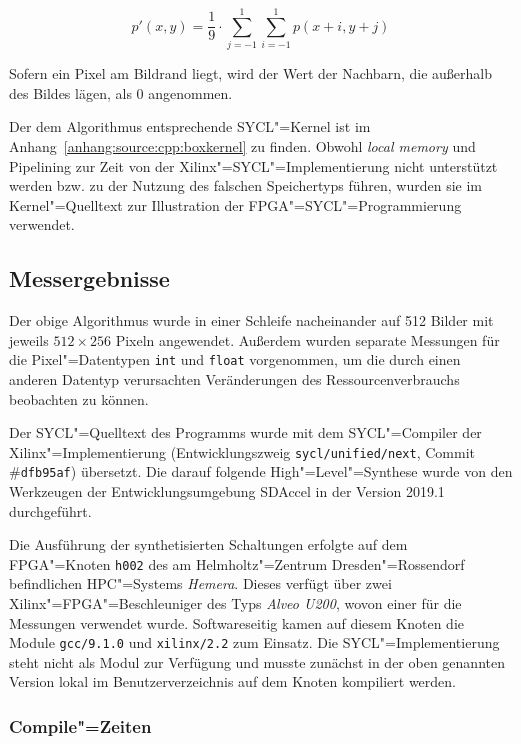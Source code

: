\begin{equation}
    p'(x, y) = \frac{1}{9} \cdot \sum_{j = {-1}}^{1} \sum_{i = {-1}}^{1} p(x + i, y + j)
\end{equation}

Sofern ein Pixel am Bildrand liegt, wird der Wert der Nachbarn, die außerhalb
des Bildes lägen, als $0$ angenommen.

Der dem Algorithmus entsprechende SYCL"=Kernel ist im
Anhang~\ref{anhang:source:cpp:boxkernel} zu finden. Obwohl \textit{local memory}
und Pipelining zur Zeit von der Xilinx"=SYCL"=Implementierung nicht unterstützt
werden bzw. zu der Nutzung des falschen Speichertyps führen, wurden sie im
Kernel"=Quelltext zur Illustration der FPGA"=SYCL"=Programmierung verwendet.

\subsection{Messergebnisse}

Der obige Algorithmus wurde in einer Schleife nacheinander auf \num{512} Bilder
mit jeweils $512 \times 256$ Pixeln angewendet. Außerdem wurden separate
Messungen für die Pixel"=Datentypen \texttt{int} und \texttt{float}
vorgenommen, um die durch einen anderen Datentyp verursachten Veränderungen des
Ressourcenverbrauchs beobachten zu können.

Der SYCL"=Quelltext des Programms wurde mit dem SYCL"=Compiler der
Xilinx"=Implementierung (Entwicklungszweig \texttt{sycl/unified/next},
Commit \#\texttt{dfb95af}) übersetzt. Die darauf folgende High"=Level"=Synthese
wurde von den Werkzeugen der Entwicklungsumgebung SDAccel in der Version 2019.1
durchgeführt.

Die Ausführung der synthetisierten Schaltungen erfolgte auf dem FPGA"=Knoten
\texttt{h002} des am Helmholtz"=Zentrum Dresden"=Rossendorf befindlichen
HPC"=Systems \textit{Hemera}. Dieses verfügt über zwei
Xilinx"=FPGA"=Beschleuniger des Typs \textit{Alveo U200}, wovon einer für die
Messungen verwendet wurde. Softwareseitig kamen auf diesem Knoten die Module
\texttt{gcc/9.1.0} und \texttt{xilinx/2.2} zum Einsatz. Die
SYCL"=Implementierung steht nicht als Modul zur Verfügung und musste zunächst
in der oben genannten Version lokal im Benutzerverzeichnis auf dem Knoten
kompiliert werden.

\subsubsection{Compile"=Zeiten}

